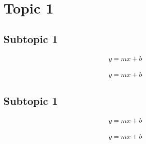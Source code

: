 \documentclass[a4paper, english, 12pt]{article}
\begin{document}
    \fullPageTitle

    \section{Topic 1}
        \begin{paracol}{2}
            
            \begin{fleqn}
                \subsection{Subtopic 1}

                \begin{align*}
                    y = mx + b
                \end{align*}



                \begin{align*}
                    y = mx + b
                \end{align*}



                \newpage
                \switchcolumn

                \subsection{Subtopic 1}

                \begin{align*}
                    y = mx + b
                \end{align*}


                \begin{align*}
                    y = mx + b
                \end{align*}



                
            \end{fleqn}
        \end{paracol}

        \newpage
\end{document}
